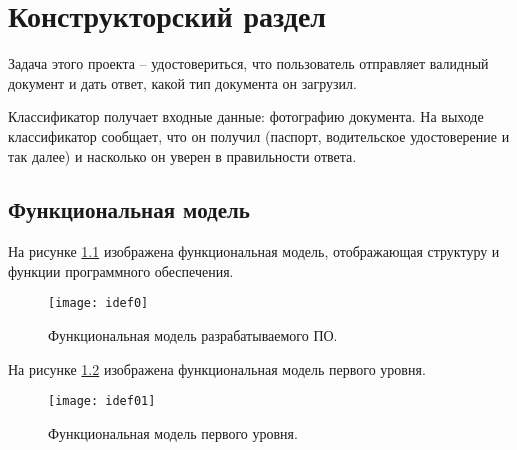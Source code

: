 \chapter{\textbf{Конструкторский раздел}}

Задача этого проекта -- удостовериться, что пользователь отправляет валидный документ и дать ответ, какой тип документа он загрузил. 

Классификатор получает входные данные: фотографию документа. На выходе классификатор сообщает, что он получил (паспорт, водительское удостоверение и так далее) и насколько он уверен в правильности ответа.

\section{Функциональная модель}

На рисунке \ref{img:idef0} изображена функциональная модель, отображающая структуру и функции программного обеспечения. 

\begin{figure}[H]
	\centering
	\texttt{[image: idef0]}
	\caption{Функциональная модель разрабатываемого ПО. }
	\label{img:idef0}
\end{figure}

На рисунке \ref{img:idef01} изображена функциональная модель первого уровня. 

\begin{figure}[H]
	\centering
	\texttt{[image: idef01]}
	\caption{Функциональная модель первого уровня. }
	\label{img:idef01}
\end{figure}
